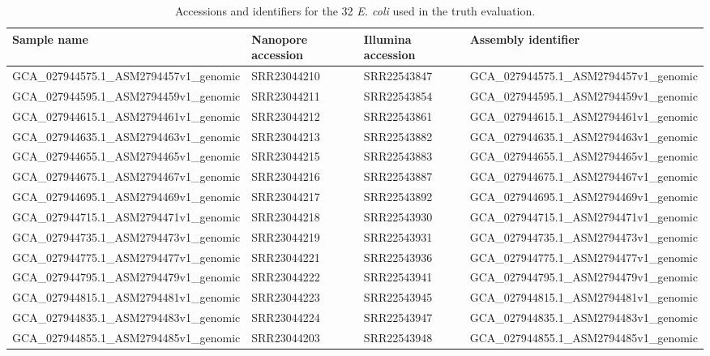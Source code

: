 \begin{sidewaystable}[ht]
\centering
\caption{Accessions and identifiers for the 32 \textit{E. coli} used in the truth evaluation.}
\begin{tabular}{|l|l|l|l|}
\hline
\textbf{Sample name} & \textbf{Nanopore accession} & \textbf{Illumina accession} & \textbf{Assembly identifier} \\ \hline
GCA\_027944575.1\_ASM2794457v1\_genomic & SRR23044210 & SRR22543847 & GCA\_027944575.1\_ASM2794457v1\_genomic \\ \hline
GCA\_027944595.1\_ASM2794459v1\_genomic & SRR23044211 & SRR22543854 & GCA\_027944595.1\_ASM2794459v1\_genomic \\ \hline
GCA\_027944615.1\_ASM2794461v1\_genomic & SRR23044212 & SRR22543861 & GCA\_027944615.1\_ASM2794461v1\_genomic \\ \hline
GCA\_027944635.1\_ASM2794463v1\_genomic & SRR23044213 & SRR22543882 & GCA\_027944635.1\_ASM2794463v1\_genomic \\ \hline
GCA\_027944655.1\_ASM2794465v1\_genomic & SRR23044215 & SRR22543883 & GCA\_027944655.1\_ASM2794465v1\_genomic \\ \hline
GCA\_027944675.1\_ASM2794467v1\_genomic & SRR23044216 & SRR22543887 & GCA\_027944675.1\_ASM2794467v1\_genomic \\ \hline
GCA\_027944695.1\_ASM2794469v1\_genomic & SRR23044217 & SRR22543892 & GCA\_027944695.1\_ASM2794469v1\_genomic \\ \hline
GCA\_027944715.1\_ASM2794471v1\_genomic & SRR23044218 & SRR22543930 & GCA\_027944715.1\_ASM2794471v1\_genomic \\ \hline
GCA\_027944735.1\_ASM2794473v1\_genomic & SRR23044219 & SRR22543931 & GCA\_027944735.1\_ASM2794473v1\_genomic \\ \hline
GCA\_027944775.1\_ASM2794477v1\_genomic & SRR23044221 & SRR22543936 & GCA\_027944775.1\_ASM2794477v1\_genomic \\ \hline
GCA\_027944795.1\_ASM2794479v1\_genomic & SRR23044222 & SRR22543941 & GCA\_027944795.1\_ASM2794479v1\_genomic \\ \hline
GCA\_027944815.1\_ASM2794481v1\_genomic & SRR23044223 & SRR22543945 & GCA\_027944815.1\_ASM2794481v1\_genomic \\ \hline
GCA\_027944835.1\_ASM2794483v1\_genomic & SRR23044224 & SRR22543947 & GCA\_027944835.1\_ASM2794483v1\_genomic \\ \hline
GCA\_027944855.1\_ASM2794485v1\_genomic  & SRR23044203 & SRR22543948 & GCA\_027944855.1\_ASM2794485v1\_genomic \\ \hline

\end{tabular}
\end{sidewaystable}
